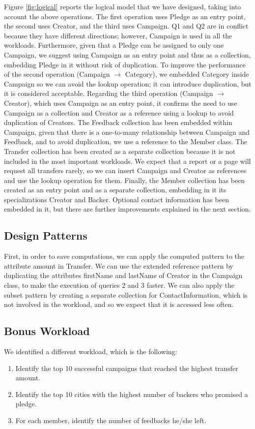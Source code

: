 \documentclass[pdflatex,sn-mathphys-num]{sn-jnl}
\begin{document}
Figure \ref{fig:logical} reports the logical model that we have designed, taking into account the above operations.
The first operation uses Pledge as an entry point, the second uses Creator, and the third uses Campaign.
Q1 and Q2 are in conflict because they have different directions; however, Campaign is used in all the workloads.
Furthermore, given that a Pledge can be assigned to only one Campaign, we suggest using Campaign as an entry point and thus as a collection, embedding 
Pledge in it without risk of duplication.
To improve the performance of the second operation (Campaign $\to$ Category), we embedded Category inside Campaign
so we can avoid the lookup operation; it can introduce duplication, but it is considered acceptable.
Regarding the third operation (Campaign $\to$ Creator), which uses Campaign as an entry point, it confirms
the need to use Campaign as a collection and Creator as a reference using a lookup to avoid duplication of Creators.
The Feedback collection has been embedded within Campaign, given that there is a one-to-many relationship 
between Campaign and Feedback, and to avoid duplication, we use a reference to the Member class. 
The Transfer collection has been created as a separate collection because it is
not included in the most important workloads. We expect that a report or a page will request all transfers
rarely, so we can insert Campaign and Creator as references and use the lookup operation for them.
Finally, the Member collection has been created as an entry point and as a separate collection, embedding in it 
its specializations Creator and Backer. Optional contact information has been embedded in it, but there are further
improvements explained in the next section.

\subsection{Design Patterns}
First, in order to save computations, we can apply the computed pattern to the attribute amount in Transfer. We can use the extended reference pattern by 
duplicating the attributes firstName and lastName of Creator in the Campaign class, to make the execution of queries 2 and 3 faster. 
We can also apply the subset pattern by creating a separate collection for ContactInformation, which is not involved in the workload, 
and so we expect that it is accessed less often.

\subsection{Bonus Workload}
We identified a different workload, which is the following:
\begin{enumerate}
    \item Identify the top 10 successful campaigns that reached the highest transfer amount.    
    \item Identify the top 10 cities with the highest number of backers who promised a pledge.
    \item For each member, identify the number of feedbacks he/she left.
\end{enumerate}
\end{document}
